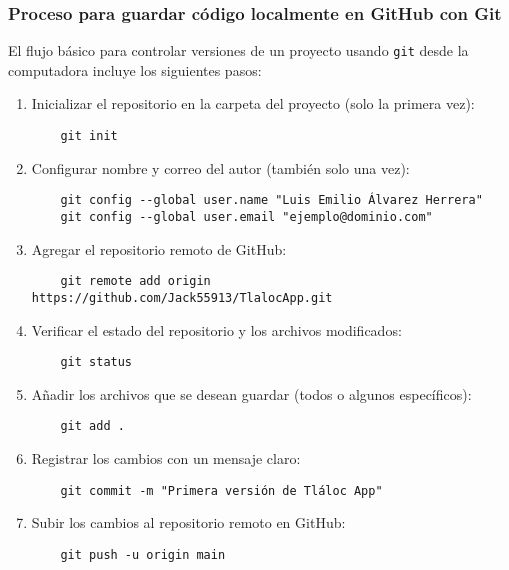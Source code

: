 \subsubsection*{Proceso para guardar código localmente en GitHub con Git}

El flujo básico para controlar versiones de un proyecto usando \texttt{git} desde la computadora incluye los siguientes pasos:

\begin{enumerate}
    \item Inicializar el repositorio en la carpeta del proyecto (solo la primera vez):
    \begin{verbatim}
    git init
    \end{verbatim}
    \item Configurar nombre y correo del autor (también solo una vez):
    \begin{verbatim}
    git config --global user.name "Luis Emilio Álvarez Herrera"
    git config --global user.email "ejemplo@dominio.com"
    \end{verbatim}
    
    \item Agregar el repositorio remoto de GitHub:
    \begin{verbatim}
    git remote add origin https://github.com/Jack55913/TlalocApp.git
    \end{verbatim}
    
    \item Verificar el estado del repositorio y los archivos modificados:
    \begin{verbatim}
    git status
    \end{verbatim}
    
    \item Añadir los archivos que se desean guardar (todos o algunos específicos):
    \begin{verbatim}
    git add .
    \end{verbatim}
    
    \item Registrar los cambios con un mensaje claro:
    \begin{verbatim}
    git commit -m "Primera versión de Tláloc App"
    \end{verbatim}
    
    \item Subir los cambios al repositorio remoto en GitHub:
    \begin{verbatim}
    git push -u origin main
    \end{verbatim}
\end{enumerate}

